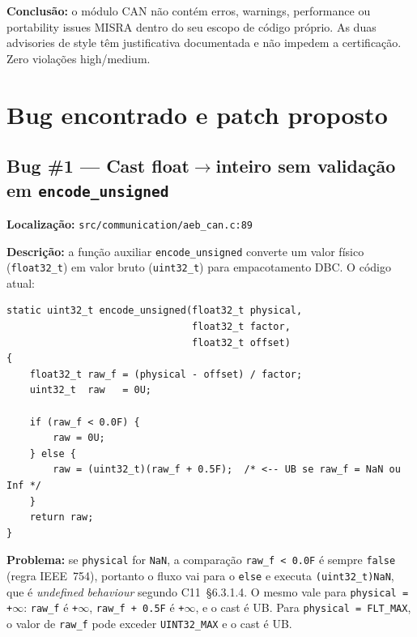 \documentclass[12pt]{article}
\begin{document}
\begin{tcolorbox}[colback=green!5, colframe=green!50!black]
\textbf{Conclusão:} o módulo CAN não contém erros, warnings, performance ou portability issues MISRA
dentro do seu escopo de código próprio. As duas advisories de style têm justificativa documentada e
não impedem a certificação. Zero violações high/medium.
\end{tcolorbox}

\section{Bug encontrado e patch proposto}
\label{sec:bug1}

\subsection{Bug \#1 --- Cast float$\to$inteiro sem validação em \texttt{encode\_unsigned}}

\textbf{Localização:} \texttt{src/communication/aeb\_can.c:89}

\textbf{Descrição:} a função auxiliar \texttt{encode\_unsigned} converte um valor físico
(\texttt{float32\_t}) em valor bruto (\texttt{uint32\_t}) para empacotamento DBC. O código atual:

\begin{lstlisting}[caption={Código atual (vulnerável).}]
static uint32_t encode_unsigned(float32_t physical,
                                float32_t factor,
                                float32_t offset)
{
    float32_t raw_f = (physical - offset) / factor;
    uint32_t  raw   = 0U;

    if (raw_f < 0.0F) {
        raw = 0U;
    } else {
        raw = (uint32_t)(raw_f + 0.5F);  /* <-- UB se raw_f = NaN ou Inf */
    }
    return raw;
}
\end{lstlisting}

\textbf{Problema:} se \texttt{physical} for \texttt{NaN}, a comparação \texttt{raw\_f < 0.0F} é sempre
\texttt{false} (regra IEEE~754), portanto o fluxo vai para o \texttt{else} e executa
\texttt{(uint32\_t)NaN}, que é \textit{undefined behaviour} segundo C11~\S6.3.1.4. O mesmo vale para
\texttt{physical = +$\infty$}: \texttt{raw\_f} é \texttt{+$\infty$}, \texttt{raw\_f + 0.5F} é
\texttt{+$\infty$}, e o cast é UB. Para \texttt{physical = }\texttt{FLT\_MAX}, o valor de \texttt{raw\_f}
pode exceder \texttt{UINT32\_MAX} e o cast é UB.
\end{document}
